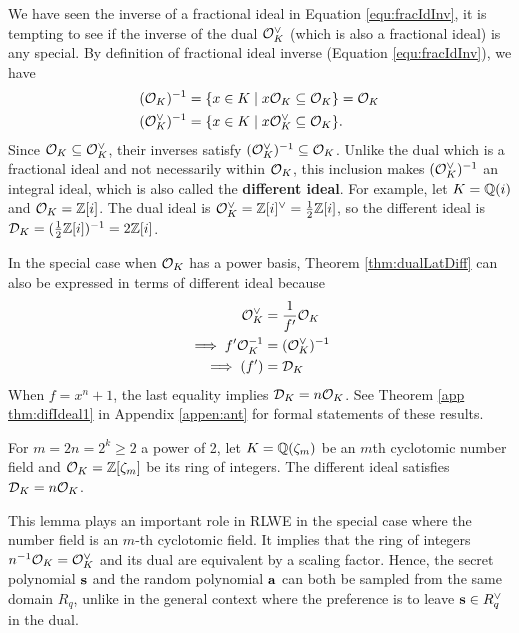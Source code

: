 \documentclass[../main.tex]{subfiles}
\begin{document}
We have seen the inverse of a fractional ideal in Equation \ref{equ:fracIdInv}, it is tempting to see if the inverse of the dual $\mathcal{O}_K^{\vee}$ (which is also a fractional ideal) is any special. By definition of fractional ideal inverse (Equation \ref{equ:fracIdInv}), we have 
\begin{align*}
    (\mathcal{O}_K)^{-1} &= \{x \in K \mid x \mathcal{O}_K \subseteq \mathcal{O}_K \} = \mathcal{O}_K \\
    (\mathcal{O}_K^{\vee})^{-1} &= \{x \in K \mid x \mathcal{O}_K^{\vee} \subseteq \mathcal{O}_K \}.
\end{align*}
Since $\mathcal{O}_K \subseteq \mathcal{O}_K^{\vee}$, their inverses satisfy $(\mathcal{O}_K^{\vee})^{-1} \subseteq \mathcal{O}_K$. Unlike the dual which is a fractional ideal and not necessarily within $\mathcal{O}_K$, this inclusion makes $(\mathcal{O}_K^{\vee})^{-1}$ an integral ideal, which is also called the \textbf{different ideal}.
\reversemarginpar
{}
For example, let $K=\mathbb{Q}(i)$ and $\mathcal{O}_K=\mathbb{Z}[i]$. The dual ideal is $\mathcal{O}_K^{\vee}=\mathbb{Z}[i]^{\vee}=\frac{1}{2}\mathbb{Z}[i]$, so the different ideal is $\mathcal{D}_K=(\frac{1}{2}\mathbb{Z}[i])^{-1}=2\mathbb{Z}[i]$.

In the special case when $\mathcal{O}_K$ has a power basis, Theorem \ref{thm:dualLatDiff} can also be expressed in terms of different ideal because  
\begin{align*}
    \mathcal{O}_K^{\vee} &= \frac{1}{f'} \mathcal{O}_K \\
    \implies f' \mathcal{O}_K^{-1} &= (\mathcal{O}_K^{\vee})^{-1} \\
    \implies (f') &= \mathcal{D}_K
\end{align*}
When $f=x^n+1$, the last equality implies $\mathcal{D}_K=n\mathcal{O}_K$.%
See Theorem \ref{app thm:difIdeal1} %
in Appendix \ref{appen:ant} for formal statements of these results.

\begin{lemma}
\label{lm:difIdeal}
\reversemarginpar
{}
For $m=2n=2^k \ge 2$ a power of 2, let $K=\mathbb{Q}(\zeta_m)$ be an $m$th cyclotomic number field and $\mathcal{O}_K=\mathbb{Z}[\zeta_m]$ be its ring of integers. The different ideal satisfies $\mathcal{D}_K = n \mathcal{O}_K$.
\end{lemma}
This lemma plays an important role in RLWE in the special case where the number field is an $m$-th cyclotomic field. It implies that the ring of integers $n^{-1}\mathcal{O}_K=\mathcal{O}_K^{\vee}$ and its dual are equivalent by a scaling factor. Hence, the secret polynomial $\mathbf{s}$ and the random polynomial $\mathbf{a}$ can both be sampled from the same domain $R_q$, unlike in the general context where the preference is to leave $\mathbf{s} \in R_q^{\vee}$ in the dual. 
\end{document}
